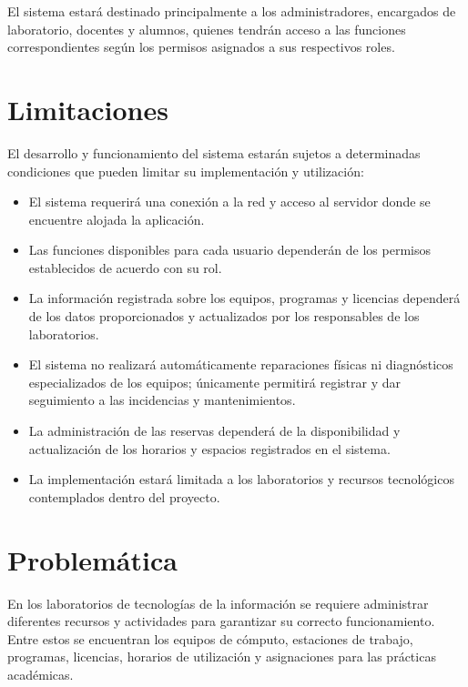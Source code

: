 El sistema estará destinado principalmente a los administradores, encargados de laboratorio, docentes y alumnos, quienes tendrán acceso a las funciones correspondientes según los permisos asignados a sus respectivos roles.

\section{Limitaciones}

El desarrollo y funcionamiento del sistema estarán sujetos a determinadas condiciones que pueden limitar su implementación y utilización:

\begin{itemize}[leftmargin=*]

    \item El sistema requerirá una conexión a la red y acceso al servidor donde se encuentre alojada la aplicación.

    \item Las funciones disponibles para cada usuario dependerán de los permisos establecidos de acuerdo con su rol.

    \item La información registrada sobre los equipos, programas y licencias dependerá de los datos proporcionados y actualizados por los responsables de los laboratorios.

    \item El sistema no realizará automáticamente reparaciones físicas ni diagnósticos especializados de los equipos; únicamente permitirá registrar y dar seguimiento a las incidencias y mantenimientos.

    \item La administración de las reservas dependerá de la disponibilidad y actualización de los horarios y espacios registrados en el sistema.

    \item La implementación estará limitada a los laboratorios y recursos tecnológicos contemplados dentro del proyecto.

\end{itemize}

\section{Problemática}

En los laboratorios de tecnologías de la información se requiere administrar diferentes recursos y actividades para garantizar su correcto funcionamiento. Entre estos se encuentran los equipos de cómputo, estaciones de trabajo, programas, licencias, horarios de utilización y asignaciones para las prácticas académicas.

